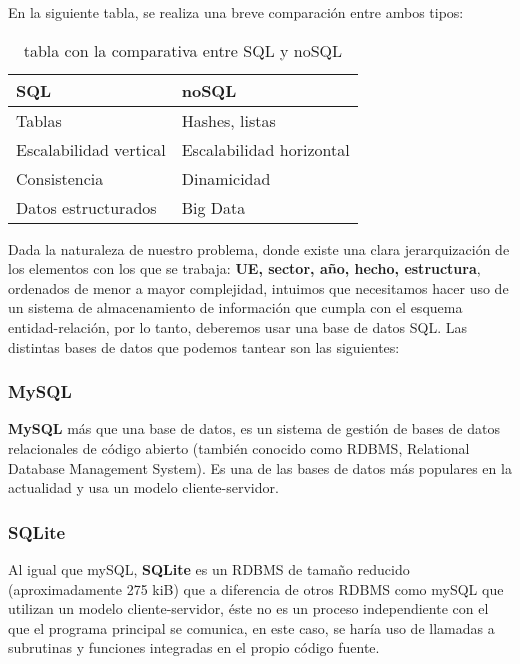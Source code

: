 En la siguiente tabla, se realiza una breve comparación entre ambos tipos: 

    \begin{table}[H]
        \begin{center}
            \begin{tabular}{ |l|l| } \hline
                \textbf{SQL} & \textbf{noSQL} \\ \hline
                Tablas & Hashes, listas \\
                Escalabilidad vertical & Escalabilidad horizontal \\
                Consistencia & Dinamicidad \\
                Datos estructurados & Big Data \\ \hline
            \end{tabular}
            \caption{tabla con la comparativa entre SQL y noSQL}
            \label{tab:databases}
        \end{center}
    \end{table}

Dada la naturaleza de nuestro problema, donde existe una clara jerarquización de los
elementos con los que se trabaja: \textbf{UE, sector, año, hecho, estructura}, ordenados
de menor a mayor complejidad, intuimos que necesitamos hacer uso de un sistema de
almacenamiento de información que cumpla con el esquema entidad-relación, por lo tanto,
deberemos usar una base de datos SQL. Las distintas bases de datos que podemos tantear
son las siguientes:

    \subsubsection{MySQL}
    \textbf{MySQL} más que una base de datos, es un sistema de gestión de bases de datos
    relacionales de código abierto (también conocido como RDBMS, Relational Database
    Management System). Es una de las bases de datos más populares en la actualidad y usa
    un modelo cliente-servidor.
    

    \subsubsection{SQLite}
    Al igual que mySQL, \textbf{SQLite} es un RDBMS de tamaño reducido (aproximadamente
    275 kiB) que a diferencia de otros RDBMS como mySQL que utilizan un modelo
    cliente-servidor, éste no es un proceso independiente con el que el programa principal
    se comunica, en este caso, se haría uso de llamadas a subrutinas y funciones integradas
    en el propio código fuente.

